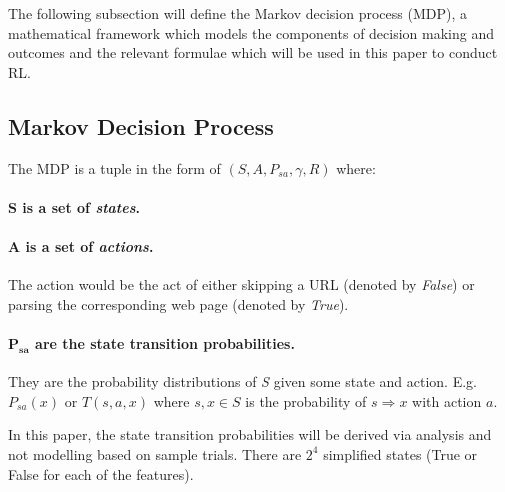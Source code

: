\documentclass{article}
\begin{document}
The following subsection will define the Markov decision process (MDP), a mathematical framework which models the components of decision making and outcomes \cite{bib-08} and the relevant formulae which will be used in this paper to conduct RL.
\newpage

\subsection{Markov Decision Process}
\label{sec:4.2}
The MDP is a tuple in the form of $ (S, A, P_{sa}, \gamma, R) $ \cite{bib-08} where:

\paragraph{$ \boldsymbol{S} $ is a set of \textit{states}.}

\paragraph{$ \boldsymbol{A} $ is a set of \textit{actions}.} The action would be the act of either skipping a URL (denoted by \textit{False}) or parsing the corresponding web page (denoted by \textit{True}).

\paragraph{$ \boldsymbol{P_{sa}} $ are the state transition probabilities.} They are the probability distributions of \textit{S} given some state and action. E.g. $ P_{sa}(x) $ or $ T(s, a, x) $ where $ s, x \in S $ is the probability of $ s \Rightarrow x $ with action $ a $.
\medskip

In this paper, the state transition probabilities will be derived via analysis and not modelling based on sample trials. There are $ 2^4 $ simplified states (True or False for each of the features).

\begin{comment}
Recall that a simplified state is expressed as a tuple: \\

\textit{( Predicted Relevance via URL, \\
\indent Host Parse-Skip Ratio, \\
\indent Mean Avg. Relevance (Previous Host), \\
\indent Mean Avg. Relevance (Current Host)} )
\end{comment}
\end{document}
